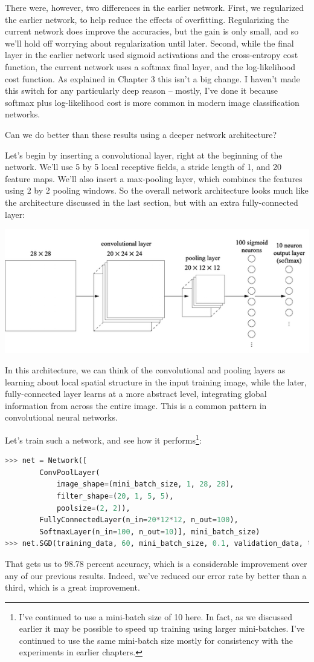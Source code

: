 \documentclass[a4paper,twoside,10pt]{book}
\begin{document}
There were, however, two differences in the earlier network. First, we regularized the earlier network, to help reduce the effects of overfitting. Regularizing the current network does improve the accuracies, but the gain is only small, and so we'll hold off worrying about regularization until later. Second, while the final layer in the earlier network used sigmoid activations and the cross-entropy cost function, the current network uses a softmax final layer, and the log-likelihood cost function. As explained in Chapter 3 this isn't a big change. I haven't made this switch for any particularly deep reason -- mostly, I've done it because softmax plus log-likelihood cost is more common in modern image classification networks.

Can we do better than these results using a deeper network architecture?

Let's begin by inserting a convolutional layer, right at the beginning of the network. We'll use 5 by 5 local receptive fields, a stride length of 1, and 20 feature maps. We'll also insert a max-pooling layer, which combines the features using 2 by 2 pooling windows. So the overall network architecture looks much like the architecture discussed in the last section, but with an extra fully-connected layer:
\begin{center}
	\includegraphics[width=0.7\linewidth]{figures/ch6/simple_conv}
\end{center}
In this architecture, we can think of the convolutional and pooling layers as learning about local spatial structure in the input training image, while the later, fully-connected layer learns at a more abstract level, integrating global information from across the entire image. This is a common pattern in convolutional neural networks.

Let's train such a network, and see how it performs\footnote{I've continued to use a mini-batch size of 10 here. In fact, as we discussed earlier it may be possible to speed up training using larger mini-batches. I've continued to use the same mini-batch size mostly for consistency with the experiments in earlier chapters.}:
\begin{lstlisting}[language=Python]
>>> net = Network([
		ConvPoolLayer(
			image_shape=(mini_batch_size, 1, 28, 28), 
			filter_shape=(20, 1, 5, 5), 
			poolsize=(2, 2)),
		FullyConnectedLayer(n_in=20*12*12, n_out=100),
		SoftmaxLayer(n_in=100, n_out=10)], mini_batch_size)
>>> net.SGD(training_data, 60, mini_batch_size, 0.1, validation_data, test_data)   

\end{lstlisting}
That gets us to 98.78 percent accuracy, which is a considerable improvement over any of our previous results. Indeed, we've reduced our error rate by better than a third, which is a great improvement.
\end{document}
